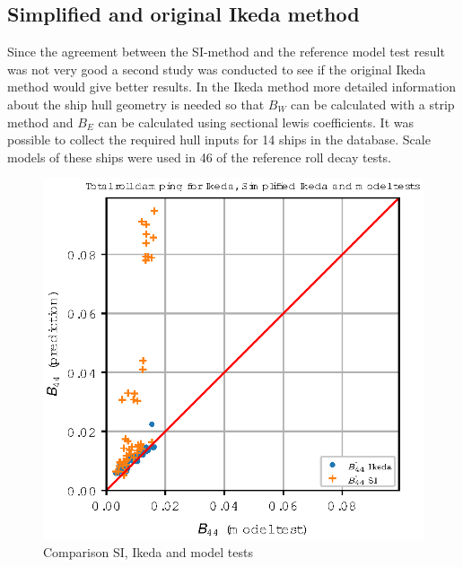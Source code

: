 \subsection{Simplified and original Ikeda method}
\label{se:si_ikeda_model}
Since the agreement between the SI-method and the reference model test result was not very good a second study was conducted to see if the original Ikeda method would give better results. In the Ikeda method more detailed information about the ship hull geometry is needed so that $B_W$ can be calculated with a strip method and $B_E$ can be calculated using sectional lewis coefficients. It was possible to collect the required hull inputs for 14 ships in the database. Scale models of these ships were used in 46 of the reference roll decay tests.

\begin{figure}[H]
    \centering
    \includegraphics[]{figures/si_ikeda_model.eps}
        \vspace{-0.5cm}
    \caption{Comparison SI, Ikeda and model tests}
    \label{fig:si_ikeda_model}
\end{figure}
